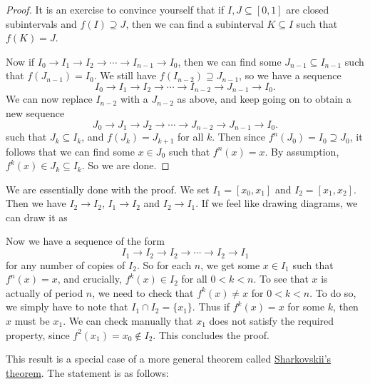 \documentclass{shortart}
\theoremstyle{definition}
\begin{document}
\begin{proof}
  It is an exercise to convince yourself that if $I, J \subseteq [0, 1]$ are closed subintervals and $f(I) \supseteq J$, then we can find a subinterval $K \subseteq I$ such that $f(K) = J$.

  Now if $I_0 \to I_1 \to I_2 \to \cdots \to I_{n - 1} \to I_0$, then we can find some $J_{n - 1} \subseteq I_{n-1}$ such that $f(J_{n-1}) = I_0$. We still have $f(I_{n-2}) \supseteq J_{n-1}$, so we have a sequence
  \[
    I_0 \to I_1 \to I_2 \to \cdots \to I_{n-2} \to J_{n-1} \to I_0.
  \]
  We can now replace $I_{n-2}$ with a $J_{n-2}$ as above, and keep going on to obtain a new sequence
  \[
    J_0 \to J_1 \to J_2 \to \cdots \to J_{n-2} \to J_{n-1} \to I_0.
  \]
  such that $J_k \subseteq I_k$, and $f(J_k) = J_{k+1}$ for all $k$. Then since $f^n(J_0) = I_0 \supseteq J_0$, it follows that we can find some $x \in J_0$ such that $f^n(x) = x$. By assumption, $f^k(x) \in J_k \subseteq I_k$. So we are done.
\end{proof}

We are essentially done with the proof. We set $I_1 = [x_0, x_1]$ and $I_2 = [x_1, x_2]$. Then we have $I_2 \to I_2$, $I_1 \to I_2$ and $I_2 \to I_1$. If we feel like drawing diagrams, we can draw it as

\begin{center}
\end{center}

Now we have a sequence of the form
\[
  I_1 \to I_2 \to I_2 \to \cdots \to I_2 \to I_1
\]
for any number of copies of $I_2$. So for each $n$, we get some $x \in I_1$ such that $f^n(x) = x$, and crucially, $f^k(x) \in I_2$ for all $0 < k < n$. To see that $x$ is actually of period $n$, we need to check that $f^k(x) \not= x$ for $0 < k < n$. To do so, we simply have to note that $I_1 \cap I_2  = \{x_1\}$. Thus if $f^k(x) = x$ for some $k$, then $x$ must be $x_1$. We can check manually that $x_1$ does not satisfy the required property, since $f^2(x_1) = x_0 \not\in I_2$. This concludes the proof.

This result is a special case of a more general theorem called \href{https://en.wikipedia.org/wiki/Sharkovskii\%27s_theorem}{Sharkovskii's theorem}. The statement is as follows:
\end{document}

